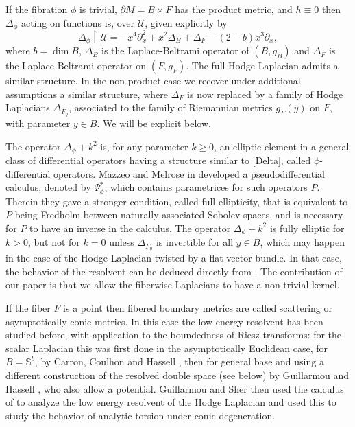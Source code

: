 \documentclass[JEP,XML,SOM,Unicode,NoFloatCountersInSection,published]{cedram}
\theoremstyle{plain}
\theoremstyle{definition}
\begin{document}
If the fibration $\phi$ is trivial, $\partial M=B\times F$ has the product metric, and
$h\equiv 0$ then $\Delta_{\phi}$ acting on functions is, over $\mathscr{U}$, given explicitly by
\begin{equation}\label{Delta}
\Delta_{\phi} \restriction \mathscr{U} = -x^{4}\partial_{x}^{2} + x^{2}\Delta_{B} + \Delta_{F} - (2-b)x^{3}\partial_{x},
\end{equation}
where $b= \dim B$, $\Delta_B$ is the Laplace-Beltrami
operator of $(B,g_{B})$ and
$\Delta_{F}$ is the Laplace-Beltrami operator on $(F,g_{F})$.
The full Hodge Laplacian admits a similar structure.
In the non-product case we recover under additional assumptions a similar structure,
where $\Delta_{F}$ is now replaced by a family of Hodge Laplacians $\Delta_{F_y}$, associated to
the family of Riemannian metrics $g_F(y)$ on $F$, with parameter $y\in B$. We will be explicit below.

The operator $\Delta_{\phi}+k^2$ is, for any parameter $k\geq0$, an elliptic element in a general class of differential operators having a structure similar to \eqref{Delta}, called $\phi$-differential operators. Mazzeo and Melrose in \cite{mazzeo1998pseudodifferential} developed a pseudodifferential calculus, denoted by $\Psi^*_\phi$, which contains parametrices for such operators $P$. Therein they gave a stronger condition, called full ellipticity, that
is equivalent to $P$ being Fredholm between naturally associated Sobolev spaces, and is necessary for $P$
to have an inverse in the calculus. The operator $\Delta_{\phi}+k^2$ is fully elliptic for $k>0$, but not for $k=0$ unless $\Delta_{F_y}$ is invertible for all $y\in B$, which may happen in the case of the Hodge Laplacian twisted by a flat vector bundle.
In that case, the behavior of the resolvent can be deduced directly from
\cite{mazzeo1998pseudodifferential}. The contribution of our paper is that we allow the fiberwise Laplacians to have a non-trivial kernel.

If the fiber $F$ is a point then fibered boundary metrics are called scattering or asymptotically conic metrics. In this case the low energy resolvent has been studied before, with application to the boundedness of Riesz transforms:
for the scalar Laplacian this was first done in the asymptotically Euclidean case, \ie for $B= \mathbb{S}^b$, by
Carron, Coulhon and Hassell \cite{carron2006riesz}, then for general base and using a different construction of the resolved double space (see below) by Guillarmou and Hassell
\cite{guillarmou2008resolvent, guillarmou2009resolvent}, who also allow a potential.
Guillarmou and Sher \cite{guillarmou2014low} then used the calculus of \cite{guillarmou2008resolvent} to analyze the low energy resolvent of the Hodge Laplacian and used this to study the behavior of analytic torsion under conic degeneration.
\end{document}

